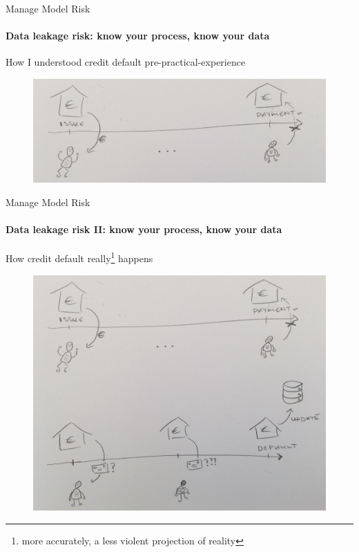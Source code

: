 \begin{frame}{Manage Model Risk}
    \framesubtitle{Data leakage risk: know your process, know your data}
    How I understood credit default pre-practical-experience
    \newline
    \begin{figure}[ht]
        \includegraphics[height=0.5\textheight]{graphics/default-process-start}
    \end{figure}

\end{frame}

\begin{frame}{Manage Model Risk}
    \framesubtitle{Data leakage risk II: know your process, know your data}
    How credit default really\footnote{
        more accurately, a less violent projection of reality
    } happens
    \newline
    \begin{figure}[ht]
        \includegraphics[height=0.6\textheight]{graphics/default-process-whole}
    \end{figure}

\end{frame}

